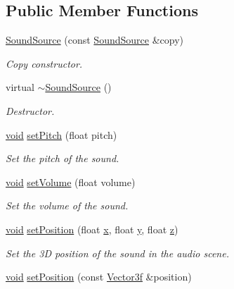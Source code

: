 \subsection*{Public Member Functions}
\begin{DoxyCompactItemize}
\item 
\hyperlink{classsf_1_1_sound_source_ae0c7728c1449fdebe65749ab6fcb3170}{Sound\-Source} (const \hyperlink{classsf_1_1_sound_source}{Sound\-Source} \&copy)
\begin{DoxyCompactList}\small\item\em Copy constructor. \end{DoxyCompactList}\item 
virtual \hyperlink{classsf_1_1_sound_source_a77c7c1524f8cb81df2de9375b0f87c5c}{$\sim$\-Sound\-Source} ()
\begin{DoxyCompactList}\small\item\em Destructor. \end{DoxyCompactList}\item 
\hyperlink{glutf90_8h_ac778d6f63f1aaf8ebda0ce6ac821b56e}{void} \hyperlink{classsf_1_1_sound_source_a72a13695ed48b7f7b55e7cd4431f4bb6}{set\-Pitch} (float pitch)
\begin{DoxyCompactList}\small\item\em Set the pitch of the sound. \end{DoxyCompactList}\item 
\hyperlink{glutf90_8h_ac778d6f63f1aaf8ebda0ce6ac821b56e}{void} \hyperlink{classsf_1_1_sound_source_a2f192f2b49fb8e2b82f3498d3663fcc2}{set\-Volume} (float volume)
\begin{DoxyCompactList}\small\item\em Set the volume of the sound. \end{DoxyCompactList}\item 
\hyperlink{glutf90_8h_ac778d6f63f1aaf8ebda0ce6ac821b56e}{void} \hyperlink{classsf_1_1_sound_source_a0480257ea25d986eba6cc3c1a6f8d7c2}{set\-Position} (float \hyperlink{gl3_8h_a92d0386e5c19fb81ea88c9f99644ab1d}{x}, float \hyperlink{gl3_8h_a66ddd433d2cacfe27f5906b7e86faeed}{y}, float \hyperlink{gl3_8h_acb78bf1972d3eaf07da34ff2e0a2f133}{z})
\begin{DoxyCompactList}\small\item\em Set the 3\-D position of the sound in the audio scene. \end{DoxyCompactList}\item 
\hyperlink{glutf90_8h_ac778d6f63f1aaf8ebda0ce6ac821b56e}{void} \hyperlink{classsf_1_1_sound_source_a17ba9ed01925395652181a7b2a7d3aef}{set\-Position} (const \hyperlink{namespacesf_af97357d7d32e7d6a700d03be2f3b4811}{Vector3f} \&position)

\end{DoxyCompactItemize}
